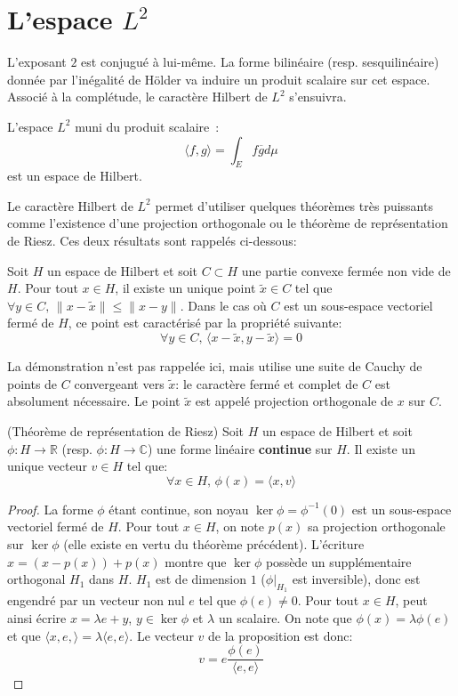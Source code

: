 \section{L'espace $L^2$}
L'exposant $2$ est conjugué à lui-même. La forme bilinéaire (resp.
sesquilinéaire) donnée par l'inégalité de Hölder va induire un produit scalaire
sur cet espace. Associé à la complétude, le caractère Hilbert de $L^2$
s'ensuivra.
\begin{mandatory}
\begin{prop}
L'espace $L^2$ muni du produit scalaire~:
\[
\langle f, g \rangle = \int_E f \overline{g} d \mu
\]
est un espace de Hilbert.
\end{prop}
\end{mandatory}
Le caractère Hilbert de $L^2$ permet d'utiliser quelques théorèmes très
puissants comme l'existence d'une projection orthogonale ou le théorème de
représentation de Riesz. Ces deux résultats sont rappelés ci-dessous:
\begin{mandatory}
\begin{theorem}
Soit $H$ un espace de Hilbert et soit $C \subset H$ une partie convexe fermée
non vide de $H$. Pour tout $x \in H$, il existe un unique point $\tilde{x} \in
C$ tel que $\forall y \in C, \, \|x-\tilde{x}\| \leq \|x-y\|$. 
Dans le cas où $C$ est un sous-espace vectoriel fermé de $H$, ce point est
caractérisé par la propriété suivante:
\[
\forall y \in C, \, \langle x - \tilde{x}, y - \tilde{x}\rangle=0
\]
\end{theorem}
\end{mandatory}
La démonstration n'est pas rappelée ici, mais utilise une suite de Cauchy
de points de $C$ convergeant vers $\tilde{x}$: le caractère fermé et complet de
$C$ est absolument nécessaire. Le point $\tilde{x}$ est appelé projection
orthogonale de $x$ sur $C$.
\begin{mandatory}
\begin{theorem}(Théorème de représentation de Riesz)
Soit $H$ un espace de Hilbert et soit $\phi \colon H \to \mathbb{R}$ (resp.
$\phi \colon H \to \mathbb{C}$) une forme linéaire \textbf{continue} sur $H$. Il
existe un unique vecteur $v \in H$ tel que:
\[
\forall x \in H, \, \phi(x) = \langle x, v \rangle
\]
\end{theorem}
\end{mandatory}
\begin{proof}
La forme $\phi$ étant continue, son noyau $\ker \phi = \phi^{-1}(0)$ est un
sous-espace vectoriel fermé de $H$. Pour tout $x\in H$, on note $p(x)$ sa
projection orthogonale sur $\ker \phi$ (elle existe en vertu du théorème
précédent). L'écriture $x = (x-p(x)) + p(x)$ montre que $\ker \phi$ possède un
supplémentaire orthogonal $H_1$ dans $H$. $H_1$ est de dimension $1$
($\phi|_{H_1}$ est inversible), donc est engendré par un vecteur non nul $e$
tel que $\phi(e) \neq 0$. Pour tout $x \in H$, peut ainsi écrire $x = \lambda e
+ y$, $y \in \ker \phi$ et $\lambda$ un scalaire. On note que $\phi(x) =
\lambda \phi(e)$ et que $\langle x, e,\rangle  = \lambda \langle e, e \rangle$.
Le vecteur $v$ de la proposition est donc:
\[
v = e \frac{\phi(e)}{\langle e, e \rangle}
\]
\end{proof}
